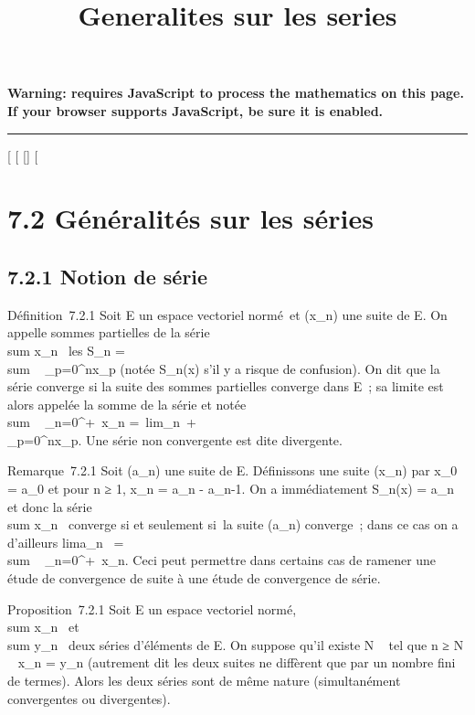 \documentclass[]{article}
\title{Generalites sur les series}
\author{}
\date{}
\begin{document}
\maketitle

\textbf{Warning: 
requires JavaScript to process the mathematics on this page.\\ If your
browser supports JavaScript, be sure it is enabled.}

\begin{center}\rule{3in}{0.4pt}\end{center}

[
[
[]
[

\section{7.2 Généralités sur les séries}

\subsection{7.2.1 Notion de série}

Définition~7.2.1 Soit E un espace vectoriel normé~et (x_n) une
suite de E. On appelle sommes partielles de la série
\\sum  x_n~ les
S_n = \\sum ~
_p=0^nx_p (notée S_n(x) s'il y a risque
de confusion). On dit que la série converge si la suite des sommes
partielles converge dans E~; sa limite est alors appelée la somme de la
série et notée \\sum ~
_n=0^+\infty~x_n =\
lim_n\rightarrow~+\infty~\\\sum
 _p=0^nx_p. Une série non convergente est
dite divergente.

Remarque~7.2.1 Soit (a_n) une suite de E. Définissons une suite
(x_n) par x_0 = a_0 et pour n ≥ 1,
x_n = a_n - a_n-1. On a immédiatement
S_n(x) = a_n et donc la série
\\sum  x_n~
converge si et seulement si~la suite (a_n) converge~; dans ce
cas on a d'ailleurs lima_n~
= \\sum ~
_n=0^+\infty~x_n. Ceci peut permettre dans certains cas
de ramener une étude de convergence de suite à une étude de convergence
de série.

Proposition~7.2.1 Soit E un espace vectoriel normé,
\\sum  x_n~ et
\\sum  y_n~ deux
séries d'éléments de E. On suppose qu'il existe N \in {}~ tel que n ≥ N \rigtharrow~
x_n = y_n (autrement dit les deux suites ne diffèrent
que par un nombre fini de termes). Alors les deux séries sont de même
nature (simultanément convergentes ou divergentes).
\end{document}
